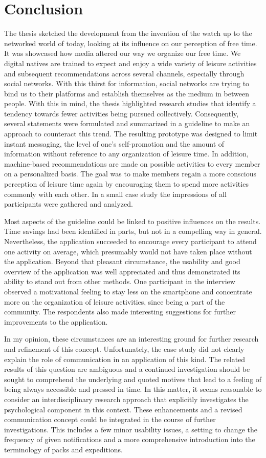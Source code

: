 \documentclass[12pt,numbers=noenddot,parskip,bibliography=totocnumbered,listof=totocnumbered,draft]{scrreprt}
\begin{document}
\chapter{Conclusion}
The thesis sketched the development from the invention of the watch up to the networked world of today, looking at its influence on our perception of free time. It was showcased how media altered our way we organize our free time. We digital natives are trained to expect and enjoy a wide variety of leisure activities and subsequent recommendations across several channels, especially through social networks. With this thirst for information, social networks are trying to bind us to their platforms and establish themselves as the medium in between people. With this in mind, the thesis highlighted research studies that identify a tendency towards fewer activities being pursued collectively. Consequently, several statements were formulated and summarized in a guideline to make an approach to counteract this trend. The resulting prototype was designed to limit instant messaging, the level of one's self-promotion and the amount of information without reference to any organization of leisure time. In addition, machine-based recommendations are made on possible activities to every member on a personalized basis. The goal was to make members regain a more conscious perception of leisure time again by encouraging them to spend more activities commonly with each other. In a small case study the impressions of all participants were gathered and analyzed.

Most aspects of the guideline could be linked to positive influences on the results. Time savings had been identified in parts, but not in a compelling way in general. Nevertheless, the application succeeded to encourage every participant to attend one activity on average, which presumably would not have taken place without the application. Beyond that pleasant circumstance, the usability and good overview of the application was well appreciated and thus demonstrated its ability to stand out from other methods. One participant in the interview observed a motivational feeling to stay less on the smartphone and concentrate more on the organization of leisure activities, since being a part of the community. The respondents also made interesting suggestions for further improvements to the application.

In my opinion, these circumstances are an interesting ground for further research and refinement of this concept. Unfortunately, the case study did not clearly explain the role of communication in an application of this kind. The related results of this question are ambiguous and a continued investigation should be sought to comprehend the underlying and quoted motives that lead to a feeling of being always accessible and pressed in time. In this matter, it seems reasonable to consider an interdisciplinary research approach that explicitly investigates the psychological component in this context. These enhancements and a revised communication concept could be integrated in the course of further investigations. This includes a few minor usability issues, a setting to change the frequency of given notifications and a more comprehensive introduction into the terminology of packs and expeditions. 
\end{document}
